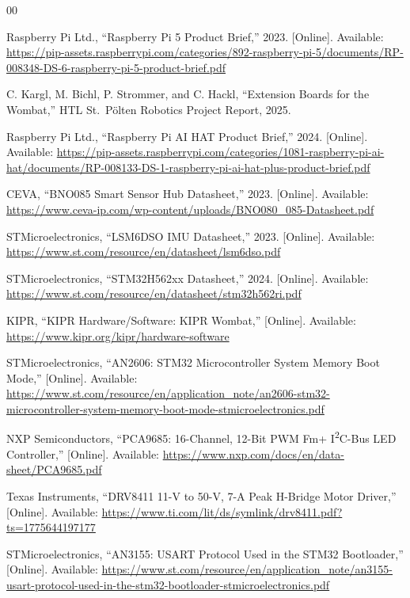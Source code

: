\documentclass[conference]{IEEEtran}
\begin{document}
	\begin{thebibliography}{00}
		
		Raspberry Pi Ltd., 
		``Raspberry Pi 5 Product Brief,'' 
		2023. [Online]. Available: \url{https://pip-assets.raspberrypi.com/categories/892-raspberry-pi-5/documents/RP-008348-DS-6-raspberry-pi-5-product-brief.pdf}
		
		C. Kargl, M. Bichl, P. Strommer, and C. Hackl, 
		``Extension Boards for the Wombat,'' 
		HTL St.~P\"olten Robotics Project Report, 2025.
		
		Raspberry Pi Ltd.,
		``Raspberry Pi AI HAT Product Brief,''
		2024. [Online]. Available: \url{https://pip-assets.raspberrypi.com/categories/1081-raspberry-pi-ai-hat/documents/RP-008133-DS-1-raspberry-pi-ai-hat-plus-product-brief.pdf}
		
		CEVA, 
		``BNO085 Smart Sensor Hub Datasheet,'' 
		2023. [Online]. Available: \url{https://www.ceva-ip.com/wp-content/uploads/BNO080_085-Datasheet.pdf}
		
		STMicroelectronics, 
		``LSM6DSO IMU Datasheet,'' 
		2023. [Online]. Available: \url{https://www.st.com/resource/en/datasheet/lsm6dso.pdf}
		
		STMicroelectronics, 
		``STM32H562xx Datasheet,'' 
		2024. [Online]. Available: \url{https://www.st.com/resource/en/datasheet/stm32h562ri.pdf}
		
		KIPR,
		``KIPR Hardware/Software: KIPR Wombat,''
		[Online]. Available: \url{https://www.kipr.org/kipr/hardware-software}
		
		STMicroelectronics,
		``AN2606: STM32 Microcontroller System Memory Boot Mode,''
		[Online]. Available: \url{https://www.st.com/resource/en/application_note/an2606-stm32-microcontroller-system-memory-boot-mode-stmicroelectronics.pdf}
		
		NXP Semiconductors,
		``PCA9685: 16-Channel, 12-Bit PWM Fm+ I\textsuperscript{2}C-Bus LED Controller,''
		[Online]. Available: \url{https://www.nxp.com/docs/en/data-sheet/PCA9685.pdf}
		
		Texas Instruments,
		``DRV8411 11-V to 50-V, 7-A Peak H-Bridge Motor Driver,''
		[Online]. Available: \url{https://www.ti.com/lit/ds/symlink/drv8411.pdf?ts=1775644197177}
		
		STMicroelectronics,
		``AN3155: USART Protocol Used in the STM32 Bootloader,''
		[Online]. Available: \url{https://www.st.com/resource/en/application_note/an3155-usart-protocol-used-in-the-stm32-bootloader-stmicroelectronics.pdf}
		
		
	\end{thebibliography}
	
	
\end{document}
